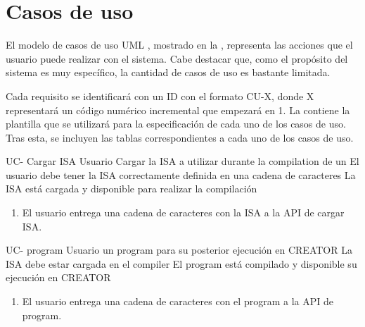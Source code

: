 \section{Casos de uso}\label{sec:usecases}

El modelo de casos de uso UML \parencite{UMLSpec}, mostrado en la
, representa las acciones que el usuario puede realizar con
el sistema. Cabe destacar que, como el propósito del sistema es muy específico,
la cantidad de casos de uso es bastante limitada.


Cada requisito se identificará con un ID con el formato CU-X, donde X
representará un código numérico incremental que empezará en 1. La
 contiene la plantilla que se utilizará para la
especificación de cada uno de los casos de uso. Tras esta, se incluyen las tablas
correspondientes a cada uno de los casos de uso.


\setcounter{i}{1}


\begin{useCase}{UC-}
    {Cargar \gls{ISA}} %
    {Usuario} %
    {Cargar la \gls{ISA} a utilizar durante la \gls{compilation} de un } %
    {El usuario debe tener la \gls{ISA} correctamente definida en una cadena de caracteres} %
    {La \gls{ISA} está cargada y disponible para realizar la compilación} %
    \begin{enumerate}[leftmargin=*, topsep=0pt, noitemsep]
        \item El usuario entrega una cadena de caracteres con la
        \gls{ISA} a la \gls{API} de cargar \gls{ISA}.
    \end{enumerate}
\end{useCase}

\begin{useCase}{UC-}
    { \gls{program}} %
    {Usuario} %
    { un \gls{program} para su posterior ejecución en CREATOR} %
    {La \gls{ISA} debe estar cargada en el \gls{compiler}} %
    {El \gls{program} está compilado y disponible su ejecución en CREATOR} %
    \begin{enumerate}[leftmargin=*, topsep=0pt, noitemsep]
        \item El usuario entrega una cadena de caracteres con el \gls{program}
        a la \gls{API} de  \gls{program}.
    \end{enumerate}
\end{useCase}
